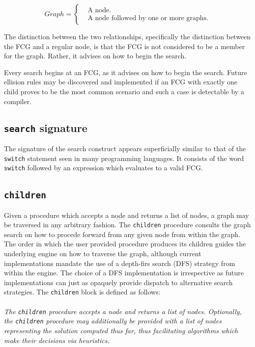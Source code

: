 \documentclass[runningheads]{llncs}
\newcommand{\code}[1]{\texttt{#1}}
\begin{document}
\begin{equation}
  Graph=\begin{cases}
  	& \text{A node}.\\
  	& \text{A node followed by one or more graphs}.
  	\end{cases}
\end{equation}

The distinction between the two relationships, specifically the distinction between the FCG and a regular node, is that the FCG is not considered to be a member for the graph. Rather, it advises on how to begin the search.

Every search begins at an FCG, as it advises on how to begin the search. Future ellision rules may be discovered and implemented if an FCG with exactly one child proves to be the most common scenario and such a case is detectable by a compiler.

\subsection{\code{search} signature}

The signature of the search construct appears superficially similar to that of the \code{switch} statement seen in many programming languages. It consists of the word \code{switch} followed by an expression which evaluates to a valid FCG.

\subsection{\code{children}}
Given a procedure which accepts a node and returns a list of nodes, a graph may be traversed in any arbitrary fashion. The \code{children} procedure consults the graph search on how to procede forward from any given node from within the graph. The order in which the user provided procedure produces its children guides the underlying engine on how to traverse the graph, although current implementations mandate the use of a depth-firs search (DFS) strategy from within the engine. The choice of a DFS implementation is irrespective as future implementations can just as opaquely provide dispatch to alternative search strategies. The \code{children} block is defined as follows:
\\
\\
\textit{The \code{children} procedure accepts a node and returns a list of nodes. Optionally, the \code{children} procedure may additionally be provided with a list of nodes representing the solution computed thus far, thus facilitating algorithms which make their decisions via heuristics.}
\end{document}
